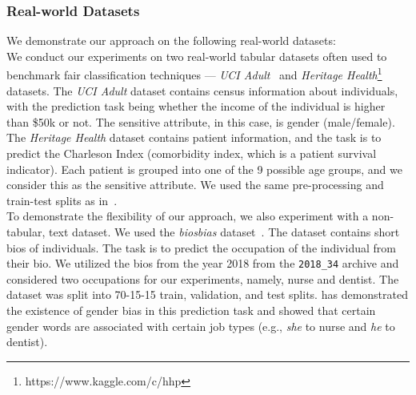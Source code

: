 \subsubsection{Real-world Datasets}
We demonstrate our approach on the following real-world datasets:\\
 We conduct our experiments on two real-world tabular datasets often used to benchmark fair classification techniques --- \textit{UCI Adult}~\cite{Dua:2019} and \textit{Heritage Health}\footnote{https://www.kaggle.com/c/hhp} datasets. The \textit{UCI Adult} dataset contains census information about individuals, with the prediction task being whether the income of the individual is higher than \$50k or not. The sensitive attribute, in this case, is gender (male/female).  The \textit{Heritage Health} dataset contains patient information, and the task is to predict the Charleson Index (comorbidity index, which is a patient survival indicator). Each patient is grouped into one of the 9 possible age groups, and we consider this as the sensitive attribute.  We used the same pre-processing and train-test splits as in~\citet{gupta2021controllable}.\\
To demonstrate the flexibility of our approach, we also experiment with a non-tabular, text dataset. We used the \textit{biosbias} dataset~\cite{de2019bias}. The dataset contains short bios of individuals. The task is to predict the occupation of the individual from their bio.
We utilized the bios from the year 2018 from the \texttt{2018\_34} archive and  considered two occupations for our experiments, namely, nurse and dentist. The dataset was split into 70-15-15 train, validation, and test splits. \citet{de2019bias} has demonstrated the existence of gender bias in this prediction task and showed that certain gender words are associated with certain job types (e.g., \textit{she} to nurse and \textit{he} to dentist). 

